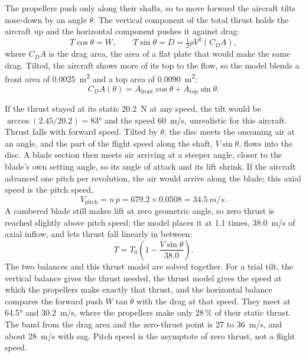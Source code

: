 The propellers push only along their shafts, so to move forward the aircraft tilts nose-down by an angle $\theta$. The vertical component of the total thrust holds the aircraft up and the horizontal component pushes it against drag:
\begin{equation}
T\cos\theta = W, \qquad T\sin\theta = D = \tfrac12 \rho V^2 (C_D A),
\end{equation}
where $C_D A$ is the drag area, the area of a flat plate that would make the same drag. Tilted, the aircraft shows more of its top to the flow, so the model blends a front area of \SI{0.0025}{m^2} and a top area of \SI{0.0090}{m^2}:
\begin{equation}
C_D A(\theta) = A_\text{front}\cos\theta + A_\text{top}\sin\theta.
\end{equation}

If the thrust stayed at its static \SI{20.2}{N} at any speed, the tilt would be $\arccos(2.45/20.2) = \ang{83}$ and the speed \SI{60}{m/s}, unrealistic for this aircraft. Thrust falls with forward speed. Tilted by $\theta$, the disc meets the oncoming air at an angle, and the part of the flight speed along the shaft, $V\sin\theta$, flows into the disc. A blade section then meets air arriving at a steeper angle, closer to the blade's own setting angle, so its angle of attack and its lift shrink. If the aircraft advanced one pitch per revolution, the air would arrive along the blade; this axial speed is the pitch speed,
\begin{equation}
V_\text{pitch} = n\,p = 679.2 \times 0.0508 = \SI{34.5}{m/s}.
\end{equation}
A cambered blade still makes lift at zero geometric angle, so zero thrust is reached slightly above pitch speed; the model places it at 1.1 times, \SI{38.0}{m/s} of axial inflow, and lets thrust fall linearly in between:
\begin{equation}
T = T_0\left(1 - \frac{V\sin\theta}{38.0}\right).
\end{equation}
The two balances and this thrust model are solved together. For a trial tilt, the vertical balance gives the thrust needed, the thrust model gives the speed at which the propellers make exactly that thrust, and the horizontal balance compares the forward push $W\tan\theta$ with the drag at that speed. They meet at \ang{64.5} and \SI{30.2}{m/s}, where the propellers make only 28\,\% of their static thrust. The band from the drag area and the zero-thrust point is 27 to \SI{36}{m/s}, and about \SI{28}{m/s} with sag. Pitch speed is the asymptote of zero thrust, not a flight speed.

